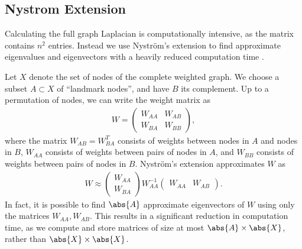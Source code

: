 \documentclass[journal]{IEEEtran}
\begin{document}
\subsection{Nystrom Extension}
\label{subsec:Nystrom}
Calculating the full graph Laplacian is computationally intensive, as the matrix
contains $n^2$ entries. Instead we use Nystr\"{o}m's extension to find
approximate eigenvalues and eigenvectors with a heavily reduced computation time
\cite{Fowlkes04}.

Let $X$ denote the set of nodes of the complete weighted graph. We choose a
subset $A\subset X$ of ``landmark nodes'', and have $B$ its complement. Up to a
permutation of nodes, we can write the weight matrix as
\begin{align}
  W = \begin{pmatrix} W_{AA} & W_{AB} \\ W_{BA} & W_{BB}
  \end{pmatrix},
\end{align}
where the matrix $W_{AB} = W_{BA}^T$ consists of weights between nodes in $A$
and nodes in $B$, $W_{AA}$ consists of weights between pairs of nodes in $A$,
and $W_{BB}$ consists of weights between pairs of nodes in $B$. Nystr\"{o}m's
extension approximates $W$ as
\begin{align}
  W \approx \begin{pmatrix} W_{AA} \\ W_{BA} \end{pmatrix}
  W_{AA}^{-1} \begin{pmatrix} W_{AA} & W_{AB}\end{pmatrix}.
\end{align}
In fact, it is possible to find $\abs{A}$ approximate eigenvectors of $W$ using
only the matrices $W_{AA},W_{AB}$. This results in a significant reduction in
computation time, as we compute and store matrices of size at most
$\abs{A}\times\abs{X}$, rather than $\abs{X}\times\abs{X}$.
\end{document}

